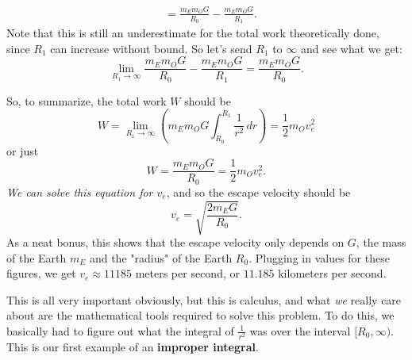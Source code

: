 \documentclass[10pt,]{book}
\newcommand{\terminology}[1]{\textbf{#1}}
\numberwithin{equation}{section}
\begin{document}
\begin{introduction}{}
\begin{align*}
& = \frac{m_{E}m_{O}G}{R_{0}} - \frac{m_{E}m_{O}G}{R_{1}}. 
\end{align*}
Note that this is still an underestimate for the total work theoretically done, since \(R_{1}\) can increase without bound. So let's send \(R_{1}\) to \(\infty\) and see what we get:%
\begin{equation*}
\lim_{R_{1}\to\infty}\frac{m_{E}m_{O}G}{R_{0}} - \frac{m_{E}m_{O}G}{R_{1}} = \frac{m_{E}m_{O}G}{R_{0}}.
\end{equation*}
%
\par
\hypertarget{p-577}{}%
So, to summarize, the total work \(W\) should be%
\begin{equation*}
W = \lim_{R_{1}\to\infty}\left(m_{E}m_{O}G\int_{R_{0}}^{R_{1}}\frac{1}{r^{2}}\,dr\right) = \frac{1}{2}m_{O}v_{e}^{2}
\end{equation*}
or just%
\begin{equation*}
W = \frac{m_{E}m_{O}G}{R_{0}} = \frac{1}{2}m_{O}v_{e}^{2}.
\end{equation*}
\emph{We can solve this equation for \(v_{e}\)}, and so the escape velocity should be%
\begin{equation*}
v_{e} = \sqrt{\frac{2 m_{E}G}{R_{0}}}.
\end{equation*}
As a neat bonus, this shows that the escape velocity only depends on \(G\), the mass of the Earth \(m_{E}\) and the "radius" of the Earth \(R_{0}\). Plugging in values for these figures, we get \(v_{e} \approx 11185\) meters per second, or \(11.185\) kilometers per second.%
\par
\hypertarget{p-578}{}%
This is all very important obviously, but this is calculus, and what \emph{we} really care about are the mathematical tools required to solve this problem. To do this, we basically had to figure out what the integral of \(\frac{1}{r^{2}}\) was over the interval \([R_{0},\infty)\). This is our first example of an \terminology{improper integral}.%
\end{introduction}%
%
%
\typeout{************************************************}
\typeout{************************************************}
%
\end{document}
